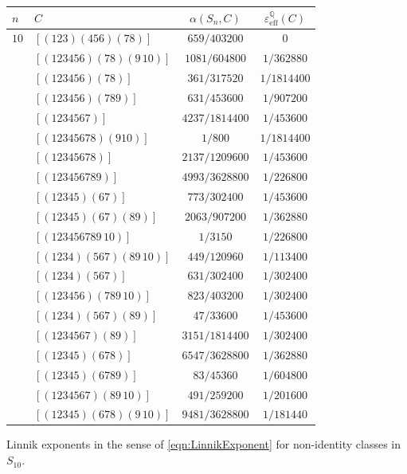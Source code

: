 \documentclass[12pt]{amsart}
\theoremstyle{definition} \newtheorem{definition}[theorem]{Definition}
\theoremstyle{example} \newtheorem{example}[theorem]{Example}
\theoremstyle{remark} \newtheorem{remark}{Remark}[theorem]
\numberwithin{equation}{section}
\numberwithin{theorem}{section}
\renewcommand{\epsilon}{\varepsilon}
\begin{document}
{\begin{table}[h]
\begin{minipage}[t]{0.49\textwidth}
		\begin{tabular}{|l|l|c|c|} \hline
			$n$ & $C$ & $\alpha(S_n,C)$ & $\epsilon_\mathrm{eff}^\mathbb{Q}(C)$ \\ \hline
			$10$& $[(1 2 3)(4 5 6)(7 8)]$ & $659/403200$ & $0$ \\
				& $[(1 2 3 4 5 6)(7 8)(9 \,10)]$ & $1081/604800$ & $1/362880$ \\
				& $[(1 2 3 4 5 6)(7 8)]$ & $361/317520$ & $1/1814400$ \\
				& $[(1 2 3 4 5 6)(7 8 9)]$ & $631/453600$ & $1/907200$ \\
				& $[(1 2 3 4 5 6 7)]$ & $4237/1814400$ & $1/453600$ \\
				& $[(1 2 3 4 5 6 7 8)(9 10)]$ & $1/800$ & $1/1814400$ \\
				& $[(1 2 3 4 5 6 7 8)]$ & $2137/1209600$ & $1/453600$ \\
				& $[(1 2 3 4 5 6 7 8 9)]$ & $4993/3628800$ & $1/226800$ \\
				& $[(1 2 3 4 5)(6 7)]$ & $773/302400$ & $1/453600$ \\
				& $[(1 2 3 4 5)(6 7)(8 9)]$ & $2063/907200$ & $1/362880$ \\
				& $[(1 2 3 4 5 6 7 8 9 \,10)]$ & $1/3150$ & $1/226800$ \\
				& $[(1 2 3 4)(5 6 7)(8 9 \,10)]$ & $449/120960$ & $1/113400$ \\
				& $[(1 2 3 4)(5 6 7)]$ & $631/302400$ & $1/302400$ \\
				& $[(1 2 3 4 5 6)(7 8 9 \,10)]$ & $823/403200$ & $1/302400$ \\
				& $[(1 2 3 4)(5 6 7)(8 9)]$ & $47/33600$ & $1/453600$ \\
				& $[(1 2 3 4 5 6 7)(8 9)]$ & $3151/1814400$ & $1/302400$ \\
				& $[(1 2 3 4 5)(6 7 8)]$ & $6547/3628800$ & $1/362880$ \\
				& $[(1 2 3 4 5)(6 7 8 9)]$ & $83/45360$ & $1/604800$ \\
				& $[(1 2 3 4 5 6 7)(8 9 \,10)]$ & $491/259200$ & $1/201600$ \\
				& $[(1 2 3 4 5)(6 7 8)(9 \,10)]$ & $9481/3628800$ & $1/181440$ \\
			\hline
		\end{tabular}
		\end{minipage}
		
		\begin{caption}{\label{tbl:S10-appendix} Linnik exponents in the sense of \eqref{eqn:LinnikExponent} for non-identity classes in $S_{10}$.}\end{caption}
	\end{table}
	}
\end{document}
